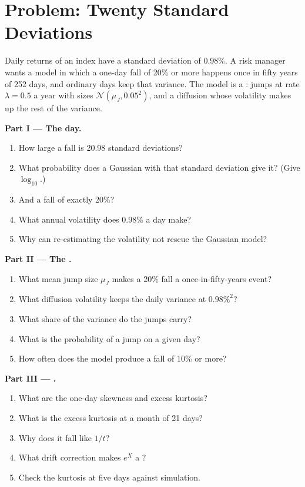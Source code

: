 \section{Problem: Twenty Standard Deviations}

\begin{problem}\label{pb:qm:jump-processes:1}
Daily returns of an index have a standard deviation of 0.98\%. A risk manager wants a model in which a
one-day fall of 20\% or more happens once in fifty years of 252 days, and ordinary days keep that
variance. The model is a : jumps at rate $\lambda = 0.5$ a year with sizes $\mathcal N(\mu_J,
0.05^2)$, and a diffusion whose volatility makes up the rest of the variance.

\medskip\noindent\textbf{Part I --- The day.}
\begin{enumerate}
\item How large a fall is 20.98 standard deviations?
\item What probability does a Gaussian with that standard deviation give it? (Give $\log_{10}$.)
\item And a fall of exactly 20\%?
\item What annual volatility does 0.98\% a day make?
\item Why can re-estimating the volatility not rescue the Gaussian model?
\end{enumerate}

\medskip\noindent\textbf{Part II --- The .}
\begin{enumerate}[resume]
\item What mean jump size $\mu_J$ makes a 20\% fall a once-in-fifty-years event?
\item What diffusion volatility keeps the daily variance at $0.98\%^2$?
\item What share of the variance do the jumps carry?
\item What is the probability of a jump on a given day?
\item How often does the model produce a fall of 10\% or more?
\end{enumerate}

\medskip\noindent\textbf{Part III --- .}
\begin{enumerate}[resume]
\item What are the one-day skewness and excess kurtosis?
\item What is the excess kurtosis at a month of 21 days?
\item Why does it fall like $1/t$?
\item What drift correction makes $e^X$ a ?
\item Check the kurtosis at five days against simulation.
\end{enumerate}


\end{problem}
